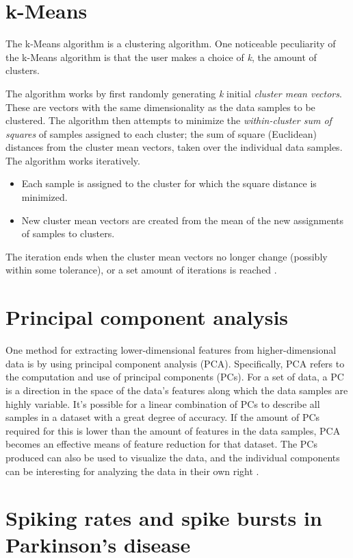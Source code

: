 \documentclass{kththesis}
\begin{document}
\section{k-Means}\label{KM BG}

The k-Means algorithm is a clustering algorithm. 
One noticeable peculiarity of the k-Means algorithm is that the user makes a choice of \textit{k}, the amount of clusters. 

The algorithm works by first randomly generating \textit{k} initial \textit{cluster mean vectors}. 
These are vectors with the same dimensionality as the data samples to be clustered. 
The algorithm then attempts to minimize the \textit{within-cluster sum of squares} of samples assigned to each cluster; the sum of square (Euclidean) distances from the cluster mean vectors, taken over the individual data samples.
The algorithm works iteratively. 
\begin{itemize}
    \item Each sample is assigned to the cluster for which the square distance is minimized.
    \item New cluster mean vectors are created from the mean of the new assignments of samples to clusters.
\end{itemize}
The iteration ends when the cluster mean vectors no longer change (possibly within some tolerance), or a set amount of iterations is reached \parencite[p258-260]{PractStats}.

\section{Principal component analysis}\label{PCA BG}

One method for extracting lower-dimensional features from higher-dimensional data is by using principal component analysis (PCA).
Specifically, PCA refers to the computation and use of principal components (PCs).
For a set of data, a PC is a direction in the space of the data's features along which the data samples are highly variable.
It's possible for a linear combination of PCs to describe all samples in a dataset with a great degree of accuracy.
If the amount of PCs required for this is lower than the amount of features in the data samples, PCA becomes an effective means of feature reduction for that dataset.
The PCs produced can also be used to visualize the data, and the individual components can be interesting for analyzing the data in their own right \parencite[p374-380]{ISLR}.

\section{Spiking rates and spike bursts in Parkinson's disease}\label{BG SpikeRates}
\end{document}
